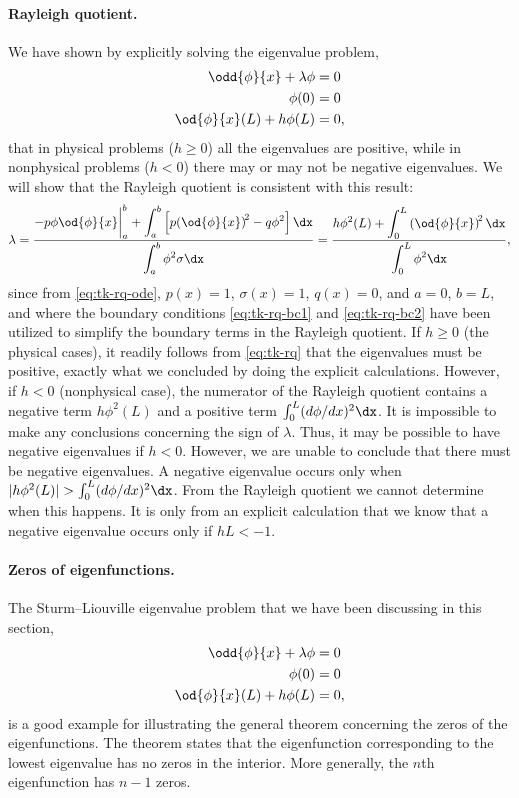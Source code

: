 \paragraph{Rayleigh quotient.}
We have shown by explicitly solving the eigenvalue problem,
\begin{align}
\label{eq:tk-rq-ode}
\odd{\phi}{x} + \lambda\phi &= 0 \\
\label{eq:tk-rq-bc1}
\phi(0) &= 0 \\
\label{eq:tk-rq-bc2}
\od{\phi}{x}(L) + h\phi(L) &= 0,
\end{align}
that in physical problems ($h \ge 0$) all the eigenvalues are positive, while in nonphysical problems ($h < 0$) there may or may not be negative eigenvalues.  We will show that the Rayleigh quotient is consistent with this result:
\begin{equation}
\label{eq:tk-rq}
\lambda = \frac{\displaystyle -p\phi\od{\phi}{x}\bigg|_a^b + \int_a^b \left[p\!\left(\od{\phi}{x}\right)^{\!2} - q\phi^2\right]\dx}{\displaystyle\int_a^b \phi^2\sigma\dx} = \frac{\displaystyle h\phi^2(L) + \int_0^L \left(\od{\phi}{x}\right)^{\!2}\dx}{\displaystyle\int_0^L \phi^2\dx},
\end{equation}
since from \eqref{eq:tk-rq-ode}, $p(x) = 1$, $\sigma(x) = 1$, $q(x) = 0$, and $a = 0$, $b = L$, and where the boundary conditions \eqref{eq:tk-rq-bc1} and \eqref{eq:tk-rq-bc2} have been utilized to simplify the boundary terms in the Rayleigh quotient.  If $h \ge 0$ (the physical cases), it readily follows from \eqref{eq:tk-rq} that the eigenvalues must be positive, exactly what we concluded by doing the explicit calculations.  However, if $h < 0$ (nonphysical case), the numerator of the Rayleigh quotient contains a negative term $h\phi^2(L)$ and a positive term $\int_0^L (d\phi/dx)^2\dx$.  It is impossible to make any conclusions concerning the sign of $\lambda$.  Thus, it may be possible to have negative eigenvalues if $h < 0$.  However, we are unable to conclude that there must be negative eigenvalues.  A negative eigenvalue occurs only when $|h\phi^2(L)| > \int_0^L (d\phi/dx)^2\dx$.  From the Rayleigh quotient we cannot determine when this happens.  It is only from an explicit calculation that we know that a negative eigenvalue occurs only if $hL < -1$.

\paragraph{Zeros of eigenfunctions.}
The Sturm--Liouville eigenvalue problem that we have been discussing in this section,
\begin{equation}
\label{eq:tk-zeros-prob}
\begin{aligned}
\odd{\phi}{x} + \lambda\phi &= 0 \\
\phi(0) &= 0 \\
\od{\phi}{x}(L) + h\phi(L) &= 0,
\end{aligned}
\end{equation}
is a good example for illustrating the general theorem concerning the zeros of the eigenfunctions.  The theorem states that the eigenfunction corresponding to the lowest eigenvalue has no zeros in the interior.  More generally, the $n$th eigenfunction has $n-1$ zeros.

